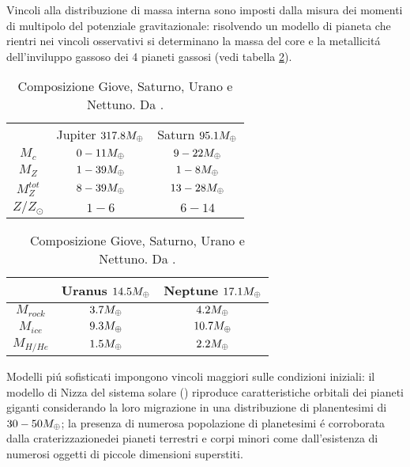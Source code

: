 Vincoli alla distribuzione di massa interna sono imposti dalla misura dei momenti di multipolo del potenziale gravitazionale: risolvendo un modello di pianeta che rientri nei vincoli osservativi si determinano la massa del core e la metallicit\'a dell'inviluppo gassoso dei 4 pianeti gassosi (vedi  tabella \ref{tab:JSUNcomp}).

\begin{table}[!htb]
    \begin{minipage}{.5\linewidth}
      \centering
        \begin{tabular}{|ccc|}
\hline
&\parbox{1.5cm}{Jupiter $317.8M_{\oplus}{}$}&\parbox{1.5cm}{Saturn $95.1M_{\oplus}{}$}\\
  $M_c$&$0-11M_{\oplus}{}$&$9-22M_{\oplus}{}$\\
\hline
$M_Z$&$1-39M_{\oplus}{}$&$1-8M_{\oplus}{}$\\
\hline
$M_Z^{tot}$&$8-39M_{\oplus}{}$&$13-28M_{\oplus}{}$\\
\hline
$Z/Z_{\odot}$&$1-6$&$6-14$\\
\hline
 \end{tabular}
    \end{minipage}%
    \begin{minipage}{.5\linewidth}
      \centering
        \begin{tabular}{|ccc|}
\hline
&\parbox{1.5cm}{Uranus $14.5M_{\oplus}{}$}&\parbox{1.5cm}{Neptune $17.1M_{\oplus}{}$}\\
\hline
$M_{rock}$&$3.7M_{\oplus}{}$&$4.2M_{\oplus}{}$\\
\hline
$M_{ice}$&$9.3M_{\oplus}{}$&$10.7M_{\oplus}{}$\\
\hline
$M_{H/He}$&$1.5M_{\oplus}{}$&$2.2M_{\oplus}{}$\\
\hline
        \end{tabular}
    \end{minipage} 
    \caption{Composizione Giove, Saturno, Urano e Nettuno. Da \cite{baraffe2009physical}.}\label{tab:JSUNcomp}
\end{table}

Modelli pi\'u sofisticati impongono vincoli maggiori sulle condizioni iniziali: il modello di Nizza del sistema solare (\cite{tsiganis2005origin}) riproduce caratteristiche orbitali dei pianeti giganti considerando la loro migrazione in una distribuzione di planentesimi di $30-50M_{\oplus}{}$; la presenza di numerosa popolazione di planetesimi \'e corroborata dalla craterizzazionedei pianeti terrestri e corpi minori come dall'esistenza di numerosi oggetti di piccole dimensioni superstiti.

